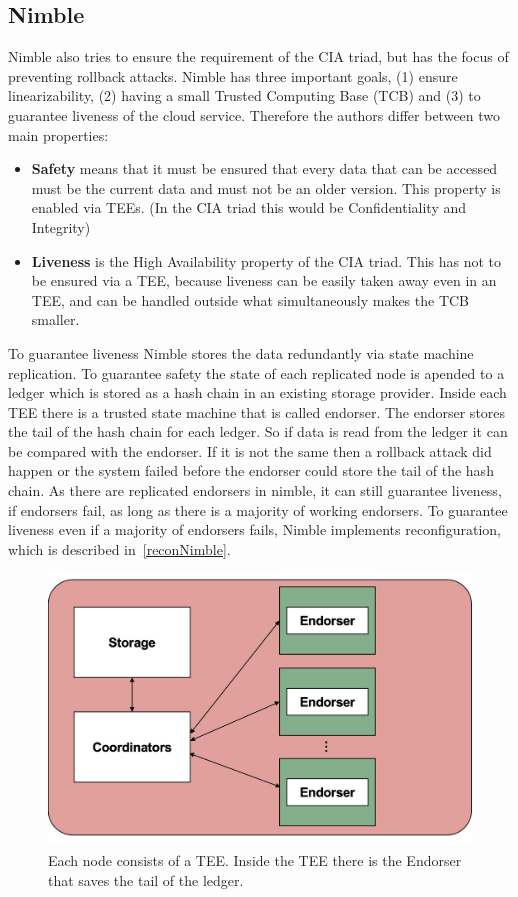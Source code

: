 \subsection{Nimble}
Nimble also tries to ensure the requirement of the CIA triad, but has the focus of preventing rollback attacks.
Nimble has three important goals, (1) ensure linearizability, (2) having a small Trusted Computing Base (TCB) and (3) to guarantee liveness of the cloud service. Therefore the authors differ between two main properties:
\begin{itemize}
	\item \textbf{Safety} means that it must be ensured that every data that can be accessed must be the current data and must not be an older version. This property is enabled via TEEs. (In the CIA triad this would be Confidentiality and Integrity)
	\item \textbf{Liveness} is the High Availability property of the CIA triad. This has not to be ensured via a TEE, because liveness can be easily taken away even in an TEE, and can be handled outside what simultaneously makes the TCB smaller.
\end{itemize}
	To guarantee liveness Nimble stores the data redundantly via state machine replication. To guarantee safety the state of each replicated node is apended to a ledger which is stored as a hash chain in an existing storage provider. Inside each TEE there is a trusted state machine that is called endorser. The endorser stores the tail of the hash chain for each ledger. So if data is read from the ledger it can be compared with the endorser. If it is not the same then a rollback attack did happen or the system failed before the endorser could store the tail of the hash chain. As there are replicated endorsers in nimble, it can still guarantee liveness, if endorsers fail, as long as there is a majority of working endorsers. To guarantee liveness even if a majority of endorsers fails, Nimble implements reconfiguration, which is described in~\ref{reconNimble}. 
\begin{figure}[b]
	\includegraphics[scale=0.12]{pictures/nimble}
	\caption{Each node consists of a TEE. Inside the TEE there is the Endorser that saves the tail of the ledger.}
	\label{nimble}
\end{figure}

